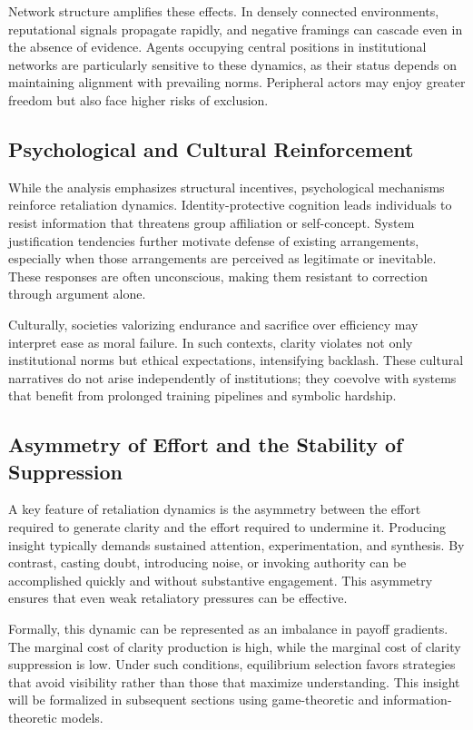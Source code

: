 \documentclass[11pt]{article}
\begin{document}
Network structure amplifies these effects. In densely connected environments, reputational signals propagate rapidly, and negative framings can cascade even in the absence of evidence. Agents occupying central positions in institutional networks are particularly sensitive to these dynamics, as their status depends on maintaining alignment with prevailing norms. Peripheral actors may enjoy greater freedom but also face higher risks of exclusion.

\subsection{Psychological and Cultural Reinforcement}

While the analysis emphasizes structural incentives, psychological mechanisms reinforce retaliation dynamics. Identity-protective cognition leads individuals to resist information that threatens group affiliation or self-concept. System justification tendencies further motivate defense of existing arrangements, especially when those arrangements are perceived as legitimate or inevitable. These responses are often unconscious, making them resistant to correction through argument alone.

Culturally, societies valorizing endurance and sacrifice over efficiency may interpret ease as moral failure. In such contexts, clarity violates not only institutional norms but ethical expectations, intensifying backlash. These cultural narratives do not arise independently of institutions; they coevolve with systems that benefit from prolonged training pipelines and symbolic hardship.

\subsection{Asymmetry of Effort and the Stability of Suppression}

A key feature of retaliation dynamics is the asymmetry between the effort required to generate clarity and the effort required to undermine it. Producing insight typically demands sustained attention, experimentation, and synthesis. By contrast, casting doubt, introducing noise, or invoking authority can be accomplished quickly and without substantive engagement. This asymmetry ensures that even weak retaliatory pressures can be effective.

Formally, this dynamic can be represented as an imbalance in payoff gradients. The marginal cost of clarity production is high, while the marginal cost of clarity suppression is low. Under such conditions, equilibrium selection favors strategies that avoid visibility rather than those that maximize understanding. This insight will be formalized in subsequent sections using game-theoretic and information-theoretic models.
\end{document}
